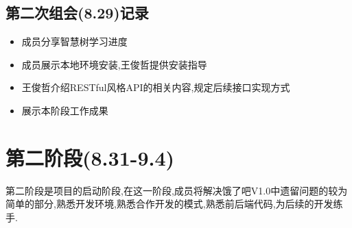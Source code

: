 \subsection{第二次组会(8.29)记录}
\begin{itemize}
    \item 成员分享智慧树学习进度
    \item 成员展示本地环境安装,王俊哲提供安装指导
    \item 王俊哲介绍RESTful风格API的相关内容,规定后续接口实现方式
    \item 展示本阶段工作成果
\end{itemize}
\section{第二阶段(8.31-9.4)}
第二阶段是项目的启动阶段,在这一阶段,成员将解决饿了吧V1.0中遗留问题的较为简单的部分,熟悉开发环境,熟悉合作开发的模式,熟悉前后端代码,为后续的开发练手.


